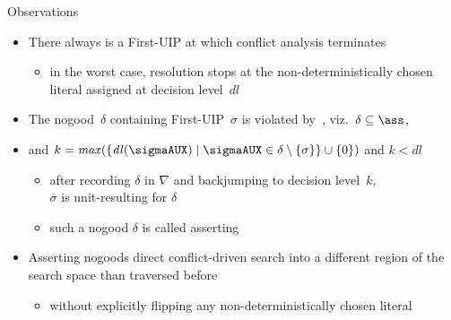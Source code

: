 \begin{frame}{Observations}
  \bigskip
  \begin{itemize}
    \item<2->
      There always is a First-UIP at which conflict analysis terminates
      \begin{itemize}\normalsize
        \item
              in the worst case, resolution stops at the
              non-deterministically chosen literal assigned at decision level~$\mathit{dl}$
      \end{itemize}
      \smallskip
    \item<3->
      The nogood~$\delta$ containing First-UIP~$\sigma$ is violated by~\ass,
      viz.\ $\delta\subseteq\ass$,
      \item<3->[] and $k=\mathit{max}(\{\mathit{dl}(\sigmaAUX)\mid\sigmaAUX\in\delta\setminus\{\sigma\}\}\cup\{0\})$ and $k<\mathit{dl}$
      \begin{itemize}\normalsize
        \item
              after recording $\delta$ in $\nabla$ and backjumping to decision level~$k$,\\
              $\overline{\sigma}$ is unit-resulting for $\delta$
        \item
              such a nogood $\delta$ is called \alert{asserting}
      \end{itemize}
      \smallskip
    \item<4-> Asserting nogoods direct conflict-driven search into a different region of the search space than traversed before
      \begin{itemize}\normalsize
        \item without explicitly flipping any non-deterministically chosen literal
      \end{itemize}
  \end{itemize}
\end{frame}
%
